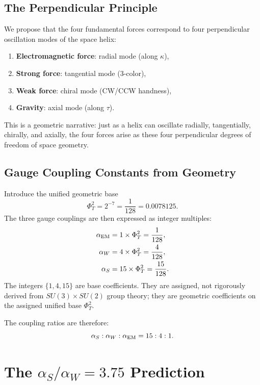 \documentclass[aps,prd,10pt]{revtex4-2}
\begin{document}
\subsection{The Perpendicular Principle}

We propose that the four fundamental forces correspond to four perpendicular
oscillation modes of the space helix:

\begin{enumerate}
\item \textbf{Electromagnetic force}: radial mode (along $\kappa$),
\item \textbf{Strong force}: tangential mode (3-color),
\item \textbf{Weak force}: chiral mode (CW/CCW handness),
\item \textbf{Gravity}: axial mode (along $\tau$).
\end{enumerate}

This is a geometric narrative: just as a helix can oscillate radially,
tangentially, chirally, and axially, the four forces arise as these four
perpendicular degrees of freedom of space geometry.

\subsection{Gauge Coupling Constants from Geometry}

Introduce the unified geometric base
\begin{equation}
\Phi_T^2 = 2^{-7} = \frac{1}{128} = 0.0078125.
\end{equation}
The three gauge couplings are then expressed as integer multiples:
\begin{align}
\alpha_{\rm EM} &= 1 \times \Phi_T^2 = \frac{1}{128}, \\
\alpha_W        &= 4 \times \Phi_T^2 = \frac{4}{128}, \\
\alpha_S        &= 15 \times \Phi_T^2 = \frac{15}{128}.
\end{align}
The integers $\{1, 4, 15\}$ are base coefficients. They are assigned,
not rigorously derived from $SU(3) \times SU(2)$ group theory;
they are geometric coefficients on the assigned unified base $\Phi_T^2$.

The coupling ratios are therefore:
\begin{equation}
\alpha_S : \alpha_W : \alpha_{\rm EM} = 15 : 4 : 1.
\end{equation}

\section{The $\alpha_S/\alpha_W = 3.75$ Prediction}
\end{document}
